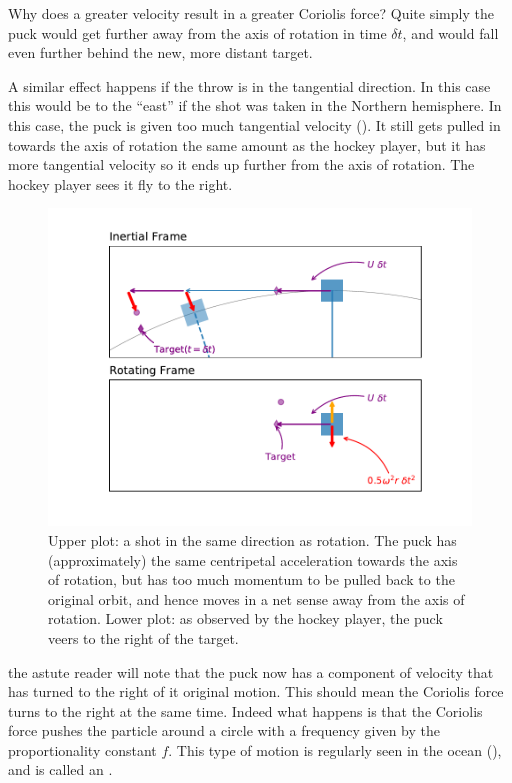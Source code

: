 Why does a greater velocity result in a greater Coriolis force?  Quite simply the puck would get further away from the axis of rotation in time $\delta t$, and would fall even further behind the new, more distant target.  
 
A similar effect happens if the throw is in the tangential direction.  In this case this would be to the ``east'' if the shot was taken in the Northern hemisphere.  In this case, the puck is given too much tangential velocity ().  It still gets pulled in towards the axis of rotation the same amount as the hockey player, but it has more tangential velocity so it ends up further from the axis of rotation.  The hockey player sees it fly to the right. 


\begin{figure}[hbt]
  \begin{center}
    \includegraphics{figs/Coriolis/Response}
    \caption{Upper plot: a shot in the same direction as rotation.  The puck has (approximately) the same centripetal acceleration towards the axis of rotation, but has too much momentum to be pulled back to the original orbit, and hence moves in a net sense away from the axis of rotation.  Lower plot: as observed by the hockey player, the puck veers to the right of the target.}
    \label{fig:Response}  
  \end{center}
\end{figure}

the astute reader will note that the puck now has a component of velocity that has turned to the right of it original motion.  This should mean the Coriolis force turns to the right at the same time.  Indeed what happens is that the Coriolis force pushes the particle around a circle with a frequency given by the proportionality constant $f$.  This type of motion is regularly seen in the ocean (), and is called an .

